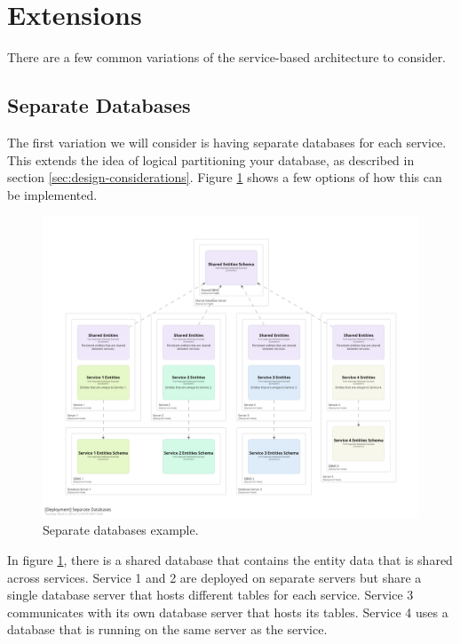 \section{Extensions}

There are a few common variations of the service-based architecture to consider.

\subsection{Separate Databases}

The first variation  we will consider is having separate databases for each service.
This extends the idea of logical partitioning your database, as described in section \ref{sec:design-considerations}.
Figure \ref{fig:separate-dbs} shows a few options of how this can be implemented.

\begin{figure}[h!]
    \begin{adjustwidth}{-8mm}{-8mm}
        \centering
        \includegraphics[trim=197 197 197 197,clip,width=0.95\paperwidth]{diagrams/separate-dbs.png}
    \end{adjustwidth}
    \caption{Separate databases example.}
    \label{fig:separate-dbs}
\end{figure}

In figure \ref{fig:separate-dbs}, there is a shared database that contains the entity data that is shared across services.
Service 1 and 2 are deployed on separate servers but share a single database server that hosts different tables for each service.
Service 3 communicates with its own database server that hosts its tables.
Service 4 uses a database that is running on the same server as the service.

